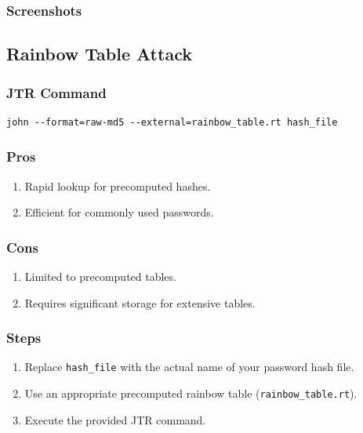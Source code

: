 \documentclass[11pt]{article}
\begin{document}
\subsubsection{Screenshots}


\subsection{Rainbow Table Attack}

\subsubsection{JTR Command}

\begin{verbatim}
john --format=raw-md5 --external=rainbow_table.rt hash_file
\end{verbatim}

\subsubsection{Pros}

\begin{enumerate}
    \item Rapid lookup for precomputed hashes.
    \item Efficient for commonly used passwords.
\end{enumerate}

\subsubsection{Cons}

\begin{enumerate}
    \item Limited to precomputed tables.
    \item Requires significant storage for extensive tables.
\end{enumerate}

\subsubsection{Steps}

\begin{enumerate}
    \item Replace \texttt{hash\_file} with the actual name of your password hash file.
    \item Use an appropriate precomputed rainbow table (\texttt{rainbow\_table.rt}).
    \item Execute the provided JTR command.
\end{enumerate}
\end{document}
